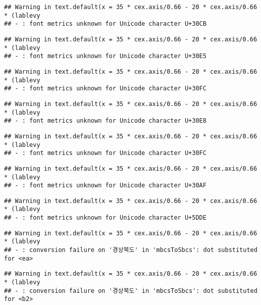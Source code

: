 \documentclass[
]{article}
\begin{document}
\begin{verbatim}
## Warning in text.default(x = 35 * cex.axis/0.66 - 20 * cex.axis/0.66 * (lablevy
## - : font metrics unknown for Unicode character U+30CB
\end{verbatim}

\begin{verbatim}
## Warning in text.default(x = 35 * cex.axis/0.66 - 20 * cex.axis/0.66 * (lablevy
## - : font metrics unknown for Unicode character U+30E5
\end{verbatim}

\begin{verbatim}
## Warning in text.default(x = 35 * cex.axis/0.66 - 20 * cex.axis/0.66 * (lablevy
## - : font metrics unknown for Unicode character U+30FC
\end{verbatim}

\begin{verbatim}
## Warning in text.default(x = 35 * cex.axis/0.66 - 20 * cex.axis/0.66 * (lablevy
## - : font metrics unknown for Unicode character U+30E8
\end{verbatim}

\begin{verbatim}
## Warning in text.default(x = 35 * cex.axis/0.66 - 20 * cex.axis/0.66 * (lablevy
## - : font metrics unknown for Unicode character U+30FC
\end{verbatim}

\begin{verbatim}
## Warning in text.default(x = 35 * cex.axis/0.66 - 20 * cex.axis/0.66 * (lablevy
## - : font metrics unknown for Unicode character U+30AF
\end{verbatim}

\begin{verbatim}
## Warning in text.default(x = 35 * cex.axis/0.66 - 20 * cex.axis/0.66 * (lablevy
## - : font metrics unknown for Unicode character U+5DDE
\end{verbatim}

\begin{verbatim}
## Warning in text.default(x = 35 * cex.axis/0.66 - 20 * cex.axis/0.66 * (lablevy
## - : conversion failure on '경상북도' in 'mbcsToSbcs': dot substituted for <ea>
\end{verbatim}

\begin{verbatim}
## Warning in text.default(x = 35 * cex.axis/0.66 - 20 * cex.axis/0.66 * (lablevy
## - : conversion failure on '경상북도' in 'mbcsToSbcs': dot substituted for <b2>
\end{verbatim}
\end{document}
